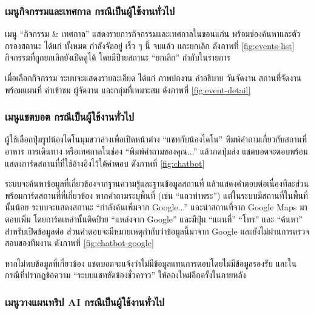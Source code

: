 
\subsubsection{เมนูกิจกรรมและเทศกาล กรณีเป็นผู้ใช้งานทั่วไป}

เมนู ``กิจกรรม \& เทศกาล'' แสดงรายการกิจกรรมและเทศกาลในขอนแก่น พร้อมช่องค้นหาและตัวกรองสถานะ ได้แก่ ทั้งหมด กำลังจัดอยู่ เร็ว ๆ นี้ จบแล้ว และยกเลิก ดังภาพที่ \ref{fig:events-list} กิจกรรมที่ถูกยกเลิกยังเปิดดูได้ โดยมีป้ายสถานะ ``ยกเลิก'' กำกับในรายการ


เมื่อเลือกกิจกรรม ระบบจะแสดงรายละเอียด ได้แก่ ภาพปกงาน คำอธิบาย วันจัดงาน สถานที่จัดงานพร้อมแผนที่ ค่าเข้าชม ผู้จัดงาน และกลุ่มที่เหมาะสม ดังภาพที่ \ref{fig:event-detail}


\subsubsection{เมนูแชตบอต กรณีเป็นผู้ใช้งานทั่วไป}

ผู้ใช้เลือกปุ่มรูปน้องไดโนมุมขวาล่างเพื่อเปิดหน้าต่าง ``แชทกับน้องไดโน'' พิมพ์คำถามเกี่ยวกับสถานที่ อาหาร การเดินทาง หรือเทศกาลในช่อง ``พิมพ์คำถามของคุณ...'' แล้วกดปุ่มส่ง แชตบอตจะตอบพร้อมแสดงการ์ดสถานที่ที่ใช้อ้างอิงไว้ใต้คำตอบ ดังภาพที่ \ref{fig:chatbot}


ระบบจะค้นหาข้อมูลที่เกี่ยวข้องจากฐานความรู้และฐานข้อมูลสถานที่ แล้วแสดงคำตอบต่อเนื่องทีละส่วน พร้อมการ์ดสถานที่ที่เกี่ยวข้อง หากคำถามระบุพื้นที่ (เช่น ``แถวท่าพระ'') แต่ในระบบมีสถานที่ในพื้นที่นั้นน้อย ระบบจะแสดงสถานะ ``กำลังค้นเพิ่มจาก Google...'' และนำสถานที่จาก Google Maps มาตอบเพิ่ม โดยการ์ดเหล่านั้นติดป้าย ``แหล่งจาก Google'' และมีปุ่ม ``แผนที่'' ``โทร'' และ ``ค้นหา'' สำหรับเปิดข้อมูลต่อ ส่วนคำตอบจะมีหมายเหตุกำกับว่าข้อมูลนี้มาจาก Google และยังไม่ผ่านการตรวจสอบของทีมงาน ดังภาพที่ \ref{fig:chatbot-google}


หากไม่พบข้อมูลที่เกี่ยวข้อง แชตบอตจะแจ้งว่าไม่มีข้อมูลแทนการตอบโดยไม่มีข้อมูลรองรับ และในกรณีที่ปรากฏข้อความ ``ระบบแชทขัดข้องชั่วคราว'' ให้ลองใหม่อีกครั้งในภายหลัง

\subsubsection{เมนูวางแผนทริป AI กรณีเป็นผู้ใช้งานทั่วไป}

